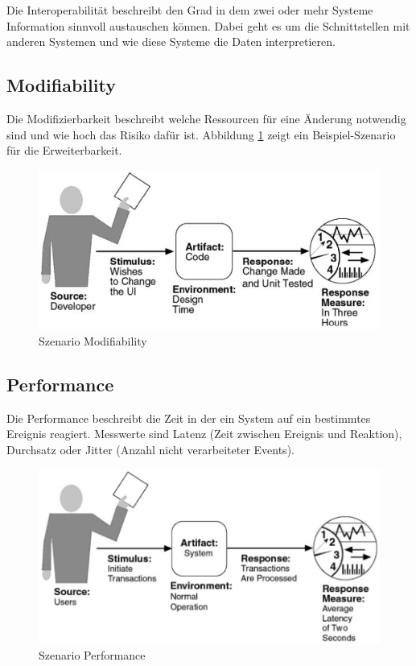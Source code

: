 Die Interoperabilität beschreibt den Grad in dem zwei oder mehr Systeme Information sinnvoll austauschen können. Dabei geht es um die Schnittstellen mit anderen Systemen und wie diese Systeme die Daten interpretieren.

\subsection{Modifiability}

Die Modifizierbarkeit beschreibt welche Ressourcen für eine Änderung notwendig sind und wie hoch das Risiko dafür ist. Abbildung \ref{fig:modifiability} zeigt ein Beispiel-Szenario für die Erweiterbarkeit.

\begin{figure}[h!]
\centering
\includegraphics[width=0.7\linewidth]{fig/modifiability}
\caption{Szenario Modifiability}
\label{fig:modifiability}
\end{figure}

\subsection{Performance}

Die Performance beschreibt die Zeit in der ein System auf ein bestimmtes Ereignis reagiert. Messwerte sind Latenz (Zeit zwischen Ereignis und Reaktion), Durchsatz oder Jitter (Anzahl nicht verarbeiteter Events).

\begin{figure}[h!]
\centering
\includegraphics[width=0.7\linewidth]{fig/performance}
\caption{Szenario Performance}
\label{fig:performance}
\end{figure}

